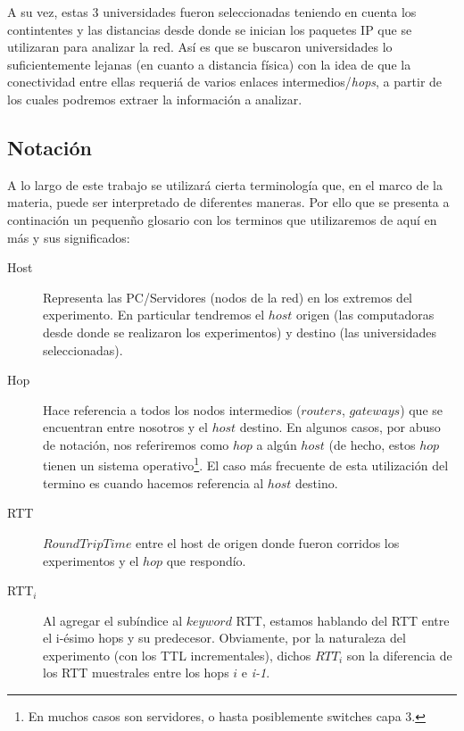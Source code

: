 \par A su vez, estas 3 universidades fueron seleccionadas teniendo en cuenta
los contintentes y las distancias desde donde se inician los paquetes IP que
se utilizaran para analizar la red. As\'i es que se buscaron universidades
lo suficientemente lejanas (en cuanto a distancia f\'isica) con la idea de que
la conectividad entre ellas
requeri\'a de varios enlaces intermedios/\textit{hops}, a partir de los cuales
podremos extraer la informaci\'on a analizar.

\subsection*{Notaci\'on}\label{sec:notacion}
\par A lo largo de este trabajo se utilizar\'a cierta terminolog\'ia que,
en el marco de la materia, puede ser interpretado de diferentes maneras. Por
ello que se presenta a continaci\'on un pequen\~no glosario con los
terminos que utilizaremos de aqu\'i en m\'as y sus significados:

\begin{description}
	\item[Host] Representa las PC/Servidores (nodos de la red) en los
		extremos del experimento. En particular tendremos el 
		$host$ origen (las computadoras desde donde se realizaron
		los experimentos) y destino (las universidades seleccionadas).
	\bigskip

	\item[Hop] Hace referencia a todos los nodos intermedios ($routers$,
		$gateways$) que se encuentran entre nosotros y el $host$
		destino. En algunos casos, por abuso de notaci\'on, nos
		referiremos como $hop$ a alg\'un $host$ (de hecho, estos
		$hop$ tienen un sistema operativo\footnote{En muchos casos
		son servidores, o hasta posiblemente switches capa 3.}. El
		caso m\'as frecuente de esta utilizaci\'on del termino es
		cuando hacemos referencia al $host$ destino.
	\bigskip

	\item[RTT] $Round Trip Time$ entre el host de origen donde fueron
		corridos los experimentos y el $hop$ que respond\'io.
	\bigskip

	\item[RTT$_i$] Al agregar el sub\'indice al $keyword$ RTT,
		estamos hablando del RTT entre el i-\'esimo hops
		y su predecesor. Obviamente, por la naturaleza del experimento
		(con los TTL incrementales), dichos $RTT_i$ son la diferencia
		de los RTT muestrales entre los hops $i$ e \textit{i-1}.
\end{description}

